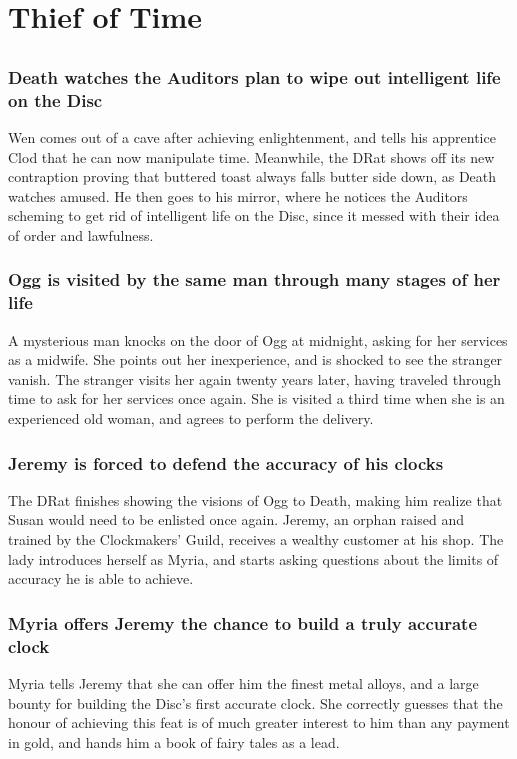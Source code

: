 \section{Thief of Time}


\subsection{}
\subsubsection{\Gls{Death} watches the Auditors plan to wipe out intelligent life on the Disc}
\Gls{Wen} comes out of a cave after achieving enlightenment, and tells his apprentice \Gls{Clod}
that he can now manipulate time. Meanwhile, the \Gls{DRat} shows off its new contraption proving
that buttered toast always falls butter side down, as \Gls{Death} watches amused. He then goes to
his mirror, where he notices the Auditors scheming to get rid of intelligent life on the Disc, since
it messed with their idea of order and lawfulness.

\subsubsection{\Gls{Ogg} is visited by the same man through many stages of her life}
A mysterious man knocks on the door of \Gls{Ogg} at midnight, asking for her services as a midwife.
She points out her inexperience, and is shocked to see the stranger vanish. The stranger visits her
again twenty years later, having traveled through time to ask for her services once again. She is
visited a third time when she is an experienced old woman, and agrees to perform the delivery.

\subsubsection{\Gls{Jeremy} is forced to defend the accuracy of his clocks}
The \Gls{DRat} finishes showing the visions of \Gls{Ogg} to \Gls{Death}, making him realize that
\Gls{Susan} would need to be enlisted once again. \Gls{Jeremy}, an orphan raised and trained by
the Clockmakers' Guild, receives a wealthy customer at his shop. The lady introduces herself as
\Gls{Myria}, and starts asking questions about the limits of accuracy he is able to achieve.

\subsubsection{\Gls{Myria} offers \Gls{Jeremy} the chance to build a truly accurate clock}
\Gls{Myria} tells \Gls{Jeremy} that she can offer him the finest metal alloys, and a large bounty
for building the Disc's first accurate clock. She correctly guesses that the honour of achieving
this feat is of much greater interest to him than any payment in gold, and hands him a book of
fairy tales as a lead.

